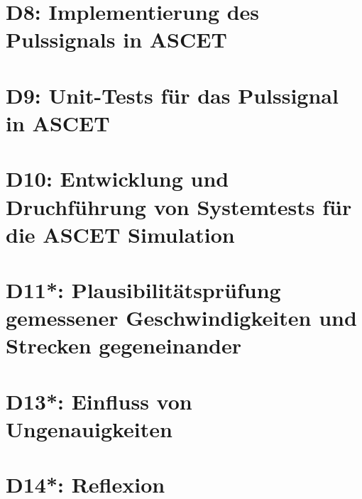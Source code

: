 \chapter{D8: Implementierung des Pulssignals in ASCET}\label{cha:D8}

\chapter{D9: Unit-Tests für das Pulssignal in ASCET}\label{cha:D9}

\chapter{D10: Entwicklung und Druchführung von Systemtests für die ASCET Simulation}\label{cha:D10}

\chapter{D11*: Plausibilitätsprüfung gemessener Geschwindigkeiten und  Strecken gegeneinander}\label{cha:D11}

\chapter{D13*: Einfluss von Ungenauigkeiten}\label{cha:D13}

\chapter{D14*: Reflexion}\label{cha:D14}